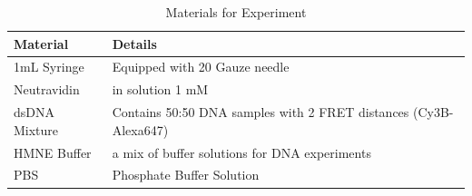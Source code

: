 \documentclass[a4paper,english,12pt,bibliography=totoc]{scrreprt}
\begin{document}
\begin{table}[h]
\centering
\caption{Materials for Experiment}
\begin{tabular}{ll}
\toprule
\textbf{Material} & \textbf{Details} \\
\midrule
1mL Syringe & Equipped with 20 Gauze needle \\
Neutravidin & in solution 1 mM \\
dsDNA Mixture & Contains 50:50 DNA samples with 2 FRET distances (Cy3B-Alexa647) \\
HMNE Buffer & a mix of buffer solutions for DNA experiments\\
PBS & Phosphate Buffer Solution \\




\bottomrule
\end{tabular}
\end{table}
\end{document}
